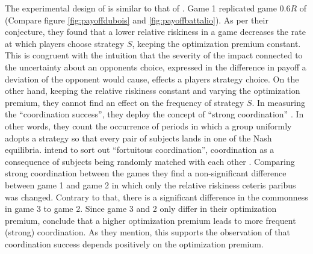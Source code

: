 The experimental design of \textcite{dubois_optimization_2012} is similar
to that of \textcite{battalio_optimization_2001}.
Game 1 replicated game $0.6R$  of \textcite{battalio_optimization_2001}  
(Compare figure \ref{fig:payoffdubois} and \ref{fig:payoffbattalio}). 
As per their conjecture, they found that a lower relative riskiness 
in a game decreases the rate at which players choose strategy $S$, 
keeping the optimization premium constant. This is congruent with 
the intuition that the severity of the impact connected to the uncertainty
about an opponents choice, expressed in
the difference in payoff a deviation of the opponent would cause,
effects a players strategy choice. 
On the other hand, keeping the relative riskiness constant and varying the
optimization premium, they cannot find an effect on the frequency of 
strategy $S$. 
In measuring the ``coordination success'', they deploy the concept of ``strong
coordination'' \textcite{dubois_optimization_2012}. 
In other words, they count the occurrence of periods in which a group
uniformly adopts a strategy so that every pair of subjects lands in one
of the Nash equilibria. \textcite{dubois_optimization_2012} intend to sort 
out ``fortuitous coordination'', coordination as a consequence of subjects being
randomly matched with each other \parencite[373]{dubois_optimization_2012}.
Comparing strong coordination between the games they find a non-significant 
difference between game 1 and game 2 in which only the relative riskiness 
ceteris paribus was changed. Contrary to that, there is a significant 
difference in the commonness in game 3 to game 2.
Since game 3 and 2 only differ in their optimization premium, 
\textcite{dubois_optimization_2012} conclude that a higher optimization
premium leads to more frequent (strong) coordination. 
As they mention, this supports the observation of 
\textcite{battalio_optimization_2001} that coordination success depends 
positively on the optimization premium. 

